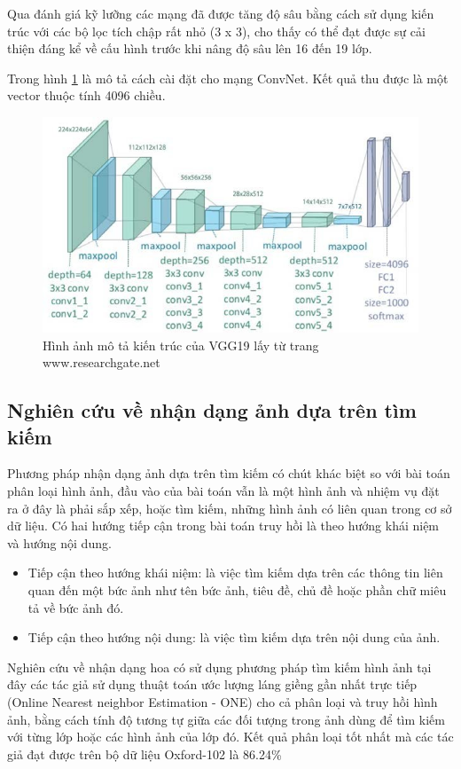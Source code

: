 \documentclass[12pt]{report}
\begin{document}
		Qua đánh giá kỹ lưỡng các mạng đã được tăng độ sâu bằng cách sử dụng kiến trúc với các bộ lọc tích chập rất nhỏ (3 x 3), cho thấy có thể đạt được sự cải thiện đáng kể về cấu hình trước khi nâng độ sâu lên 16 đến 19 lớp.
																										
		Trong hình \ref{fig:vgg19_image} là mô tả cách cài đặt cho mạng ConvNet. Kết quả thu được là một vector thuộc tính 4096 chiều.
				\begin{figure}[h]
			\centering
			\includegraphics[scale=0.7]{vgg19_image}
			\caption{Hình ảnh mô tả kiến trúc của VGG19 \cite{cia_vgg19} lấy từ trang www.researchgate.net}
			\label{fig:vgg19_image}
		\end{figure}				\newpage
																								
		
																										
		\subsection{Nghiên cứu về nhận dạng ảnh dựa trên tìm kiếm \cite{image_retrival} }
																										
		Phương pháp nhận dạng ảnh dựa trên tìm kiếm \cite{image_retrival} có chút khác biệt so với bài toán phân loại hình ảnh, đầu vào của bài toán vẫn là một hình ảnh và nhiệm vụ đặt ra ở đây là phải sắp xếp, hoặc tìm kiếm, những hình ảnh có liên quan trong cơ sở dữ liệu. Có hai hướng tiếp cận trong bài toán truy hồi là theo hướng khái niệm và hướng nội dung.
																								
		\begin{itemize}
			\item Tiếp cận theo hướng khái niệm: là việc tìm kiếm dựa trên các thông tin liên quan đến một bức ảnh như tên bức ảnh, tiêu đề, chủ đề hoặc phần chữ miêu tả về bức ảnh đó.
			\item Tiếp cận theo hướng nội dung: là việc tìm kiếm dựa trên nội dung của ảnh.
		\end{itemize}
		Nghiên cứu về nhận dạng hoa có sử dụng phương pháp tìm kiếm hình ảnh \cite{cia-ONE} tại đây các tác giả sử dụng thuật toán ước lượng láng giềng gần nhất trực tiếp (Online Nearest neighbor Estimation - ONE) cho cả phân loại và truy hồi hình ảnh, bằng cách tính độ tương tự giữa các đối tượng trong ảnh dùng để tìm kiếm với từng lớp hoặc các hình ảnh của lớp đó. Kết quả phân loại tốt nhất mà các tác giả đạt được trên bộ dữ liệu Oxford-102 \cite{cia-Nilsback06} là 86.24\%
				
\end{document}
